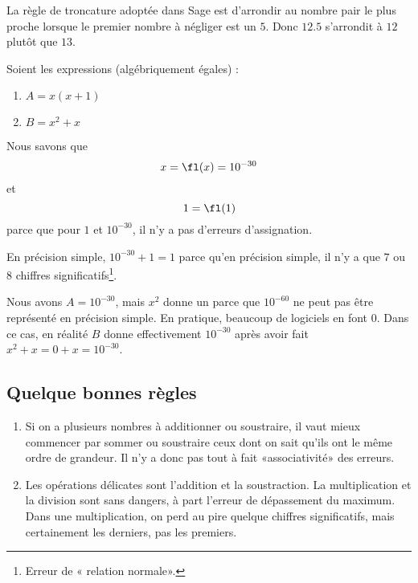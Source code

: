 La règle de troncature adoptée dans Sage est d'arrondir au nombre pair le plus proche lorsque le premier nombre à négliger est un \( 5\). Donc \( 12.5\) s'arrondit à \( 12\) plutôt que \( 13\).

\begin{example}
	Soient les expressions (algébriquement égales) :
	\begin{enumerate}
		\item
			\(A= x(x+1)\)
		\item
			\(B= x^2+x\)
	\end{enumerate}
	Nous savons que
	\begin{equation}
		x=\fl(x)=10^{-30}
	\end{equation}
	et
	\begin{equation}
		1=\fl(1)
	\end{equation}
	parce que pour \( 1\) et \( 10^{-30}\), il n'y a pas d'erreurs d'assignation.

	En précision simple, \( 10^{-30}+1=1\) parce qu'en précision simple, il n'y a que \( 7\) ou \( 8\) chiffres significatifs\footnote{Erreur de « relation normale».}.

	Nous avons $A=10^{-30}$, mais \( x^2\) donne un  parce que \( 10^{-60}\) ne peut pas être représenté en précision simple. En pratique, beaucoup de logiciels en font \( 0\). Dans ce cas, en réalité \( B\) donne effectivement \( 10^{-30}\) après avoir fait \( x^2+x=0+x=10^{-30}\).
\end{example}

\subsection{Quelque bonnes règles}

\begin{enumerate}
	\item
		Si on a plusieurs nombres à additionner ou soustraire, il vaut mieux commencer par sommer ou soustraire ceux dont on sait qu'ils ont le même ordre de grandeur. Il n'y a donc pas tout à fait «associativité» des erreurs.
	\item
		Les opérations délicates sont l'addition et la soustraction. La multiplication et la division sont sans dangers, à part l'erreur de dépassement du maximum. Dans une multiplication, on perd au pire quelque chiffres significatifs, mais certainement les derniers, pas les premiers.
\end{enumerate}

